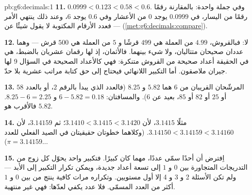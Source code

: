 \begin{solution}{pb:g6:decimals:1}
\textbf{11.} $0.0999 < 0.123 < 0.58 < 0.6$. وفي جملة واحدة:
بالمقارنة رقمًا رقمًا من اليسار، في $0.0999$ يوجد $0$ من الأعشار
وفي $0.6$ يوجد $6$، وعند ذلك ينتهي الأمر --- فعدد
الأرقام المكتوبة لا يقول شيئًا عن 
(\cref{met:g6:decimals:compare}).

\textbf{12.} لا: فبالقروش، $4.99$ من العملة هي $499$ قرشًا و $5$
من العملة هي $500$ قرش --- وهما عددان صحيحان متتاليان، ولا
شيء بينهما. فالأثمان، إذ لها رقمان عشريان بالضبط،
هي في الحقيقة أعداد صحيحة من القروش متنكرة: فهي كالأعداد
الصحيحة في السؤال 9 لها جيران ملاصقون. أما
التكبير اللانهائي فيحتاج إلى حق كتابة مراتب عشرية بلا حدّ.

\textbf{13.} المرشّحان القريبان من $6$ هما $5.82$ و $8.25$ (فالعدد
الذي يبدأ بالرقم $2$، أو بالعدد $58$ أو $25$ أو $82$ أو $85$، بعيد
عن $6$). والمسافتان: $6 - 5.82 = 0.18$ و $8.25 - 6 = 2.25$.
فالأقرب هو $5.82$.

\textbf{14.} مثلًا $3.1415$، لأن
$3.1410 < 3.1415 < 3.1420$؛ ثم $3.14159$، لأن
$3.14150 < 3.14159 < 3.14160$. (وكلاهما خطوتان حقيقيتان في
الصيد الفعلي للعدد $\pi = 3.14159\dots$)

\textbf{15.} اِفترض أن أحدًا سمّى عددًا، مهما كان
كبيرًا. فتكبير واحد يحوّل كل زوج من التدريجات المتجاورة
بين $0$ و $1$ إلى تسعة أعداد جديدة، ويمكن تكرار التكبير
إلى الأبد --- ولم تكن الأسئلة 2 و 3 و 4 إلا أول
مستويين. وتكراره مرات كافية ينتج من 
بين $0$ و $1$ أكثر من العدد المسمّى. فلا عدد يكفي
لعدّها: فهي غير منتهية.
\end{solution}
